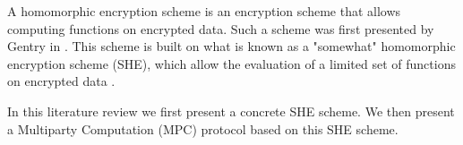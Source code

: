 \documentclass[../main.tex]{subfiles}
\begin{document}
A homomorphic encryption scheme is an encryption scheme that allows computing functions on encrypted data. Such a scheme was first presented by Gentry in \cite{gentry2009fully}.
This scheme is built on what is known as a "somewhat" homomorphic encryption scheme (SHE), which allow the evaluation of a limited set of functions on encrypted data \cite{brakerski2011fully}.

In this literature review we first present a concrete SHE scheme. We then present a Multiparty Computation (MPC) protocol based on this SHE scheme.
\end{document}
